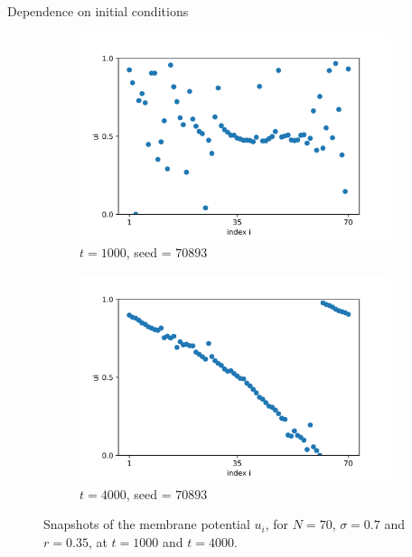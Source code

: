 \documentclass{beamer}
\begin{document}
\begin{frame}{Dependence on initial conditions}
\begin{figure}[H]
\begin{subfigure}{0.49 \textwidth}
\centering
\includegraphics[width=\linewidth]{u_seed=70893_t=1000.png}
\caption{$t=1000$, seed = $70893$}

\end{subfigure}
\hfill
\begin{subfigure}{0.49 \textwidth}
\centering
\includegraphics[width=\linewidth]{u_seed=70893_t=4000.png}
\caption{$t=4000$, seed = $70893$} 

\end{subfigure}
\caption{Snapshots of the membrane potential $u_i$, for $N=70$, $\sigma=0.7$ and $r=0.35$, at $t=1000$ and $t=4000$.}
\label{trans}
\end{figure} 
\end{frame}
\end{document}
